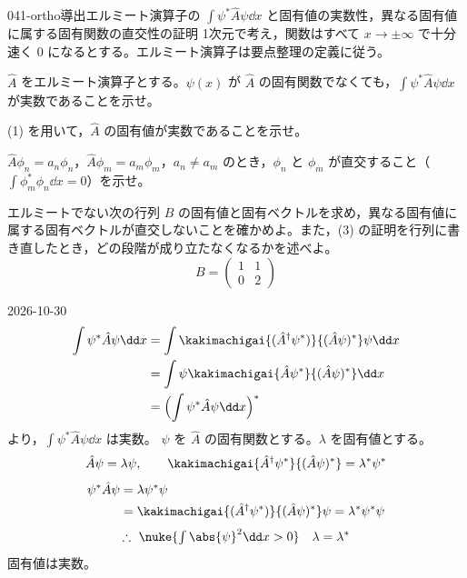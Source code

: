 \documentclass[uplatex,dvipdfmx,a4paper,11pt]{jsarticle}
\begin{document}
\begin{mondai}{041-ortho}{導出}{エルミート演算子の $\int\psi^{*}\hat{A}\psi\dd x$ と固有値の実数性，異なる固有値に属する固有関数の直交性の証明}
1次元で考え，関数はすべて $x\to\pm\infty$ で十分速く 0 になるとする。エルミート演算子は要点整理の定義に従う。
  \begin{shoumon}
    \item $\hat{A}$ をエルミート演算子とする。$\psi(x)$ が $\hat{A}$ の固有関数でなくても，$\int\psi^{*}\hat{A}\psi\dd x$ が実数であることを示せ。
    \item (1) を用いて，$\hat{A}$ の固有値が実数であることを示せ。
    \item $\hat{A}\phi_{n}=a_{n}\phi_{n}$，$\hat{A}\phi_{m}=a_{m}\phi_{m}$，$a_{n}\neq a_{m}$ のとき，$\phi_{n}$ と $\phi_{m}$ が直交すること（$\int\phi_{m}^{*}\phi_{n}\dd x=0$）を示せ。
    \item エルミートでない次の行列 $B$ の固有値と固有ベクトルを求め，異なる固有値に属する固有ベクトルが直交しないことを確かめよ。また，(3) の証明を行列に書き直したとき，どの段階が成り立たなくなるかを述べよ。
      \[
        B=\begin{pmatrix}1&1\\0&2\end{pmatrix}
      \]
  \end{shoumon}
\begin{kotaeutsushi}{2026-10-30}
\begin{align*}
\int\psi^{*}\hat{A}\psi\dd x&=\int\kakimachigai{(\hat{A}^{\dagger}\psi^{*})}{(\hat{A}\psi)^{*}}\psi\dd x\\
&=\int\psi\kakimachigai{\hat{A}\psi^{*}}{(\hat{A}\psi)^{*}}\dd x\\
&=\Bigl(\int\psi^{*}\hat{A}\psi\dd x\Bigr)^{*}
\end{align*}
より，$\int\psi^{*}\hat{A}\psi\dd x$ は実数。
$\psi$ を $\hat{A}$ の固有関数とする。$\lambda$ を固有値とする。
\[ \hat{A}\psi=\lambda\psi,\qquad\kakimachigai{\hat{A}^{\dagger}\psi^{*}}{(\hat{A}\psi)^{*}}=\lambda^{*}\psi^{*} \]
\begin{align*}
\psi^{*}\hat{A}\psi&=\lambda\psi^{*}\psi\\
&=\kakimachigai{(\hat{A}^{\dagger}\psi^{*})}{(\hat{A}\psi)^{*}}\psi=\lambda^{*}\psi^{*}\psi
\end{align*}
\[ \therefore\ \nuke{\textstyle\int\abs{\psi}^{2}\dd x>0}\quad\lambda=\lambda^{*} \]
固有値は実数。

\end{kotaeutsushi}
\end{mondai}
\end{document}
